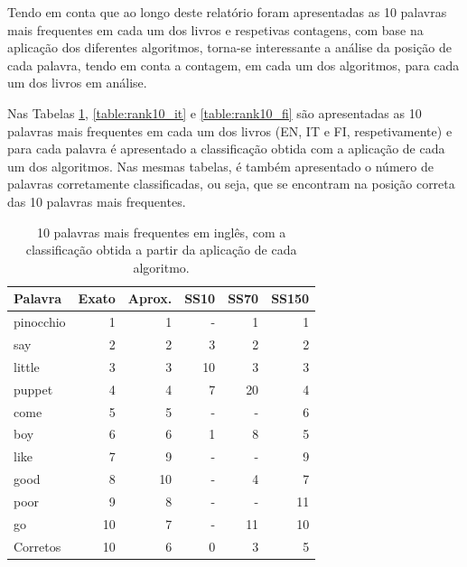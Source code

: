 \documentclass[mirror, portugues]{revdetua}
\begin{document}
Tendo em conta que ao longo deste relatório foram apresentadas as 10 palavras mais frequentes em cada um dos livros e respetivas contagens, com base na aplicação dos diferentes algoritmos, torna-se interessante a análise da posição de cada palavra, tendo em conta a contagem, em cada um dos algoritmos, para cada um dos livros em análise.

Nas Tabelas \ref{table:rank10_ing}, \ref{table:rank10_it} e \ref{table:rank10_fi} são apresentadas as 10 palavras mais frequentes em cada um dos livros (EN, IT e FI, respetivamente) e para cada palavra é apresentado a classificação obtida com a aplicação de cada um dos algoritmos. Nas mesmas tabelas, é também apresentado o número de palavras corretamente classificadas, ou seja, que se encontram na posição correta das 10 palavras mais frequentes.

\begin{table}[H]
\centering
\caption{10 palavras mais frequentes em inglês, com a classificação obtida a partir da aplicação de cada algoritmo.}
\label{table:rank10_ing}
\begin{tabular}{lrrrrr}
\toprule
Palavra & Exato & Aprox. & SS10 & SS70 & SS150 \\
\midrule
pinocchio & 1 & 1 & - & 1 & 1 \\
say & 2 & 2 & 3 & 2 & 2 \\
little & 3 & 3 & 10 & 3 & 3 \\
puppet & 4 & 4 & 7 & 20 & 4 \\
come & 5 & 5 & - & - & 6 \\
boy & 6 & 6 & 1 & 8 & 5 \\
like & 7 & 9 & - & - & 9 \\
good & 8 & 10 & - & 4 & 7 \\
poor & 9 & 8 & - & - & 11 \\
go & 10 & 7 & - & 11 & 10 \\
\midrule
Corretos & 10 & 6 & 0 & 3 & 5 \\
\bottomrule
\end{tabular}
\end{table}
\end{document}
